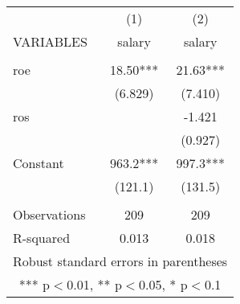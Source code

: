 \documentclass[]{article}
\begin{document}
\begin{tabular}{lcc} \hline
 & (1) & (2) \\
VARIABLES & salary & salary \\ \hline
 &  &  \\
roe & 18.50*** & 21.63*** \\
 & (6.829) & (7.410) \\
ros &  & -1.421 \\
 &  & (0.927) \\
Constant & 963.2*** & 997.3*** \\
 & (121.1) & (131.5) \\
 &  &  \\
Observations & 209 & 209 \\
 R-squared & 0.013 & 0.018 \\ \hline
\multicolumn{3}{c}{ Robust standard errors in parentheses} \\
\multicolumn{3}{c}{ *** p$<$0.01, ** p$<$0.05, * p$<$0.1} \\
\end{tabular}
\end{document}
